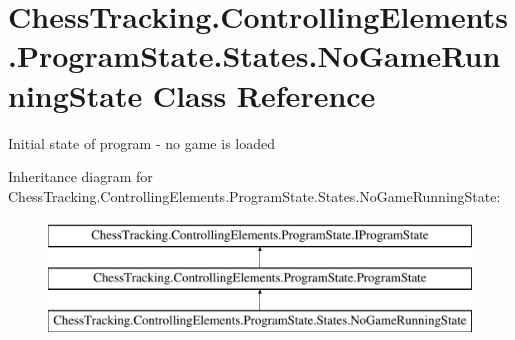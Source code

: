 \hypertarget{class_chess_tracking_1_1_controlling_elements_1_1_program_state_1_1_states_1_1_no_game_running_state}{}\section{Chess\+Tracking.\+Controlling\+Elements.\+Program\+State.\+States.\+No\+Game\+Running\+State Class Reference}
\label{class_chess_tracking_1_1_controlling_elements_1_1_program_state_1_1_states_1_1_no_game_running_state}


Initial state of program -\/ no game is loaded  


Inheritance diagram for Chess\+Tracking.\+Controlling\+Elements.\+Program\+State.\+States.\+No\+Game\+Running\+State\+:\begin{figure}[H]
\begin{center}
\leavevmode
\includegraphics[height=3.000000cm]{class_chess_tracking_1_1_controlling_elements_1_1_program_state_1_1_states_1_1_no_game_running_state}
\end{center}
\end{figure}
